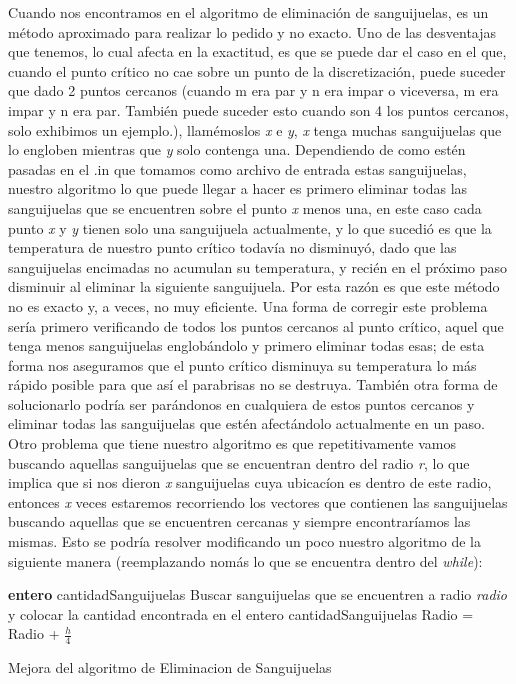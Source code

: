 \documentclass[10pt, a4paper]{article}
\begin{document}
Cuando nos encontramos en el algoritmo de eliminaci\'on de sanguijuelas, es un m\'etodo aproximado para realizar lo pedido y no exacto. Uno de las desventajas que tenemos, lo cual afecta en la exactitud, es que se puede dar el caso en el que, cuando el punto cr\'itico no cae sobre un punto de la discretizaci\'on, puede suceder que dado 2 puntos cercanos (cuando m era par y n era impar o viceversa, m era impar y n era par. Tambi\'en puede suceder esto cuando son 4 los puntos cercanos, solo exhibimos un ejemplo.), llam\'emoslos \textit{x} e \textit{y}, \textit{x} tenga muchas sanguijuelas que lo engloben mientras que \textit{y} solo contenga una. Dependiendo de como est\'en pasadas en el .in que tomamos como archivo de entrada estas sanguijuelas, nuestro algoritmo lo que puede llegar a hacer es primero eliminar todas las sanguijuelas que se encuentren sobre el punto \textit{x} menos una, en este caso cada punto \textit{x} y \textit{y} tienen solo una sanguijuela actualmente, y lo que sucedi\'o es que la temperatura de nuestro punto cr\'itico todav\'ia no disminuy\'o, dado que las sanguijuelas encimadas no acumulan su temperatura, y reci\'en en el pr\'oximo paso disminuir al eliminar la siguiente sanguijuela. Por esta raz\'on es que este m\'etodo no es exacto y, a veces, no muy eficiente. Una forma de corregir este problema ser\'ia primero verificando de todos los puntos cercanos al punto cr\'itico, aquel que tenga menos sanguijuelas englob\'andolo y primero eliminar todas esas; de esta forma nos aseguramos que el punto cr\'itico disminuya su temperatura lo m\'as r\'apido posible para que as\'i el parabrisas no se destruya. Tambi\'en otra forma de solucionarlo podr\'ia ser par\'andonos en cualquiera de estos puntos cercanos y eliminar todas las sanguijuelas que est\'en afect\'andolo actualmente en un paso. Otro problema que tiene nuestro algoritmo es que repetitivamente vamos buscando aquellas sanguijuelas que se encuentran dentro del radio \textit{r}, lo que implica que si nos dieron \textit{x} sanguijuelas cuya ubicac\'ion es dentro de este radio, entonces \textit{x} veces estaremos recorriendo los vectores que contienen las sanguijuelas buscando aquellas que se encuentren cercanas y siempre encontrar\'iamos las mismas. Esto se podr\'ia resolver modificando un poco nuestro algoritmo de la siguiente manera (reemplazando nom\'as lo que se encuentra dentro del \textit{while}):

\vspace{5mm}
\begin{algorithm}[H]
	\textbf{entero} cantidadSanguijuelas\;
	Buscar sanguijuelas que se encuentren a radio \textit{radio} y colocar la cantidad encontrada en el entero cantidadSanguijuelas\;
	Radio = Radio + $\frac{h}{4}$\;		

\caption{Mejora del algoritmo de Eliminacion de Sanguijuelas}
\end{algorithm}	
\end{document}
